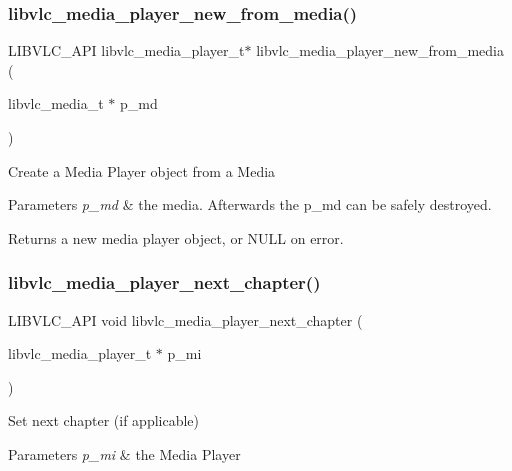 \subsubsection{\texorpdfstring{libvlc\+\_\+media\+\_\+player\+\_\+new\+\_\+from\+\_\+media()}{libvlc\_media\_player\_new\_from\_media()}}
{\footnotesize\ttfamily L\+I\+B\+V\+L\+C\+\_\+\+A\+PI libvlc\+\_\+media\+\_\+player\+\_\+t$\ast$ libvlc\+\_\+media\+\_\+player\+\_\+new\+\_\+from\+\_\+media (\begin{DoxyParamCaption}\item[{libvlc\+\_\+media\+\_\+t $\ast$}]{p\+\_\+md }\end{DoxyParamCaption})}

Create a Media Player object from a Media


\begin{DoxyParams}{Parameters}
{\em p\+\_\+md} & the media. Afterwards the p\+\_\+md can be safely destroyed. \\
\hline
\end{DoxyParams}
\begin{DoxyReturn}{Returns}
a new media player object, or N\+U\+LL on error. 
\end{DoxyReturn}
\mbox{\label{group__libvlc__media__player_ga6dfdfc7d9929c95d04b99d5d77847d48}} 
\subsubsection{\texorpdfstring{libvlc\+\_\+media\+\_\+player\+\_\+next\+\_\+chapter()}{libvlc\_media\_player\_next\_chapter()}}
{\footnotesize\ttfamily L\+I\+B\+V\+L\+C\+\_\+\+A\+PI void libvlc\+\_\+media\+\_\+player\+\_\+next\+\_\+chapter (\begin{DoxyParamCaption}\item[{libvlc\+\_\+media\+\_\+player\+\_\+t $\ast$}]{p\+\_\+mi }\end{DoxyParamCaption})}

Set next chapter (if applicable)


\begin{DoxyParams}{Parameters}
{\em p\+\_\+mi} & the Media Player \\
\hline
\end{DoxyParams}
\mbox{\label{group__libvlc__media__player_gadbfec72aef61dd499c7a5c06271911bc}} 
